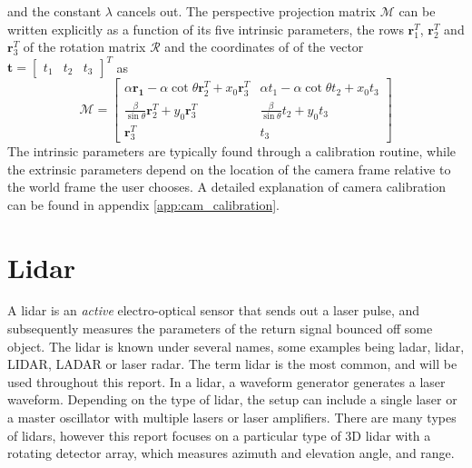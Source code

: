 and the constant $\lambda$ cancels out. The perspective projection matrix $\mathcal{M}$ can be written explicitly as a function of its five intrinsic parameters, the rows $\mathbf{r}_1^T$, $\mathbf{r}_2^T$ and $\mathbf{r}_3^T$ of the rotation matrix $\mathcal{R}$ and the coordinates of of the vector $\mathbf{t}=\begin{bmatrix}t_1 & t_2 & t_3\end{bmatrix}^T$ as 
\begin{equation}
    \mathcal{M}=\begin{bmatrix}\alpha\mathbf{r_1}-\alpha\cot{\theta}\mathbf{r}_2^T+x_0\mathbf{r}_3^T & \alpha t_1-\alpha\cot{\theta}t_2+x_0t_3\\ \frac{\beta}{\sin{\theta}}\mathbf{r}_2^T + y_0\mathbf{r}_3^T & \frac{\beta}{\sin{\theta}}t_2+y_0t_3 \\
    \mathbf{r}_3^T & t_3\end{bmatrix}
\end{equation}
The intrinsic parameters are typically found through a calibration routine, while the extrinsic parameters depend on the location of the camera frame relative to the world frame the user chooses. A detailed explanation of camera calibration can be found in appendix \ref{app:cam_calibration}.
\section{Lidar}
A lidar is an \textit{active} electro-optical sensor that sends out a laser pulse, and subsequently measures the parameters of the return signal bounced off some object. The lidar is known under several names, some examples being ladar, lidar, LIDAR, LADAR or laser radar. The term lidar is the most common, and will be used throughout this report. In a lidar, a waveform generator generates a laser waveform. Depending on the type of lidar, the setup can include a single laser or a master oscillator with multiple lasers or laser amplifiers. There are many types of lidars, however this report focuses on a particular type of 3D lidar with a rotating detector array, which measures azimuth and elevation angle, and range. 

